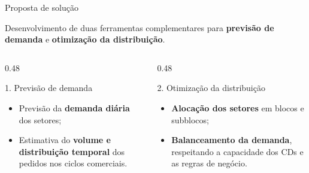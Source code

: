 \documentclass[aspectratio=169,11pt]{beamer}
\begin{document}
\begin{frame}{Proposta de solução}

\footnotesize

\begin{minipage}{\linewidth}
Desenvolvimento de duas ferramentas complementares
para \textbf{previsão de demanda} e
\textbf{otimização da distribuição}.
\end{minipage}

\vspace{0.6cm}

\begin{columns}[T,onlytextwidth]

    \begin{column}{0.48\linewidth}

        \begin{block}{\small 1. Previsão de demanda}
            \footnotesize

            \begin{itemize}
                \setlength{\itemsep}{0.5em}

                \item Previsão da
                \textbf{demanda diária}
                dos setores;

                \item Estimativa do
                \textbf{volume e distribuição temporal}
                dos pedidos nos ciclos comerciais.

            \end{itemize}

        \end{block}

    \end{column}

    \begin{column}{0.48\linewidth}

        \begin{block}{\small 2. Otimização da distribuição}
            \footnotesize

            \begin{itemize}
                \setlength{\itemsep}{0.5em}

                \item \textbf{Alocação dos setores}
                em blocos e subblocos;

                \item \textbf{Balanceamento da demanda},
                respeitando a capacidade dos CDs
                e as regras de negócio.

            \end{itemize}

        \end{block}

    \end{column}

\end{columns}

\end{frame}
\end{document}
